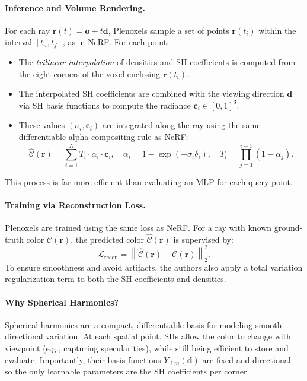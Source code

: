 \begin{enrichment}
\begin{enrichment}
    \paragraph{Inference and Volume Rendering.} For each ray \( \mathbf{r}(t) = \mathbf{o} + t\mathbf{d} \), Plenoxels sample a set of points \( \mathbf{r}(t_i) \) within the interval \( [t_n, t_f] \), as in NeRF. For each point:
    \begin{itemize}
        \item The \emph{trilinear interpolation} of densities and SH coefficients is computed from the eight corners of the voxel enclosing \( \mathbf{r}(t_i) \).
        \item The interpolated SH coefficients are combined with the viewing direction \( \mathbf{d} \) via SH basis functions to compute the radiance \( \mathbf{c}_i \in [0,1]^3 \).
        \item These values \( (\sigma_i, \mathbf{c}_i) \) are integrated along the ray using the same differentiable alpha compositing rule as NeRF:
        \[
        \hat{\mathcal{C}}(\mathbf{r}) = \sum_{i=1}^N T_i \cdot \alpha_i \cdot \mathbf{c}_i, \quad
        \alpha_i = 1 - \exp(-\sigma_i \delta_i), \quad
        T_i = \prod_{j=1}^{i-1}(1 - \alpha_j).
        \]
    \end{itemize}
    This process is far more efficient than evaluating an MLP for each query point.
    
    \paragraph{Training via Reconstruction Loss.} Plenoxels are trained using the same loss as NeRF. For a ray with known ground-truth color \( \mathcal{C}(\mathbf{r}) \), the predicted color \( \hat{\mathcal{C}}(\mathbf{r}) \) is supervised by:
    \[
    \mathcal{L}_{\text{recon}} = \left\| \hat{\mathcal{C}}(\mathbf{r}) - \mathcal{C}(\mathbf{r}) \right\|_2^2.
    \]
    To ensure smoothness and avoid artifacts, the authors also apply a total variation regularization term to both the SH coefficients and densities.
    
    \paragraph{Why Spherical Harmonics?} Spherical harmonics are a compact, differentiable basis for modeling smooth directional variation. At each spatial point, SHs allow the color to change with viewpoint (e.g., capturing specularities), while still being efficient to store and evaluate. Importantly, their basis functions \( Y_{\ell m}(\mathbf{d}) \) are fixed and directional—so the only learnable parameters are the SH coefficients per corner.
    

\end{enrichment}
\end{enrichment}
